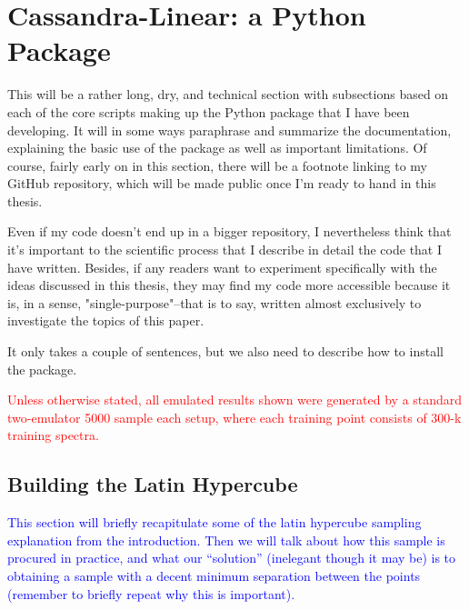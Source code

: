\chapter{Cassandra-Linear: a Python Package}

This will be a rather long, dry, and technical section with subsections based on each of the core scripts making up the Python package that I have been developing. It will in some ways paraphrase and summarize the documentation, explaining the basic use of the package as well as important limitations. Of course, fairly early on in this section, there will be a footnote linking to my GitHub repository, which will be made public once I'm ready to hand in this thesis.

Even if my code doesn't end up in a bigger repository, I nevertheless think that it's important to the scientific process that I describe in detail the code that I have written. Besides, if any readers want to experiment specifically with the ideas discussed in this thesis, they may find my code more accessible because it is, in a sense, "single-purpose"--that is to say, written almost exclusively to investigate the topics of this paper.

It only takes a couple of sentences, but we also need to describe how to install the package.

\textcolor{red}{Unless otherwise stated, all emulated results shown were generated by a standard two-emulator 5000 sample each setup, where each training point consists of 300-k training spectra.}

\section{Building the Latin Hypercube}
\label{sec: build_lhc}


\textcolor{blue}{This section will briefly recapitulate some of the latin hypercube sampling
explanation from the introduction. Then we will talk about how this sample is
procured in practice, and what our ``solution'' (inelegant though it may be)
is to obtaining a sample with a decent minimum separation between the points
(remember to briefly repeat why this is important).}

